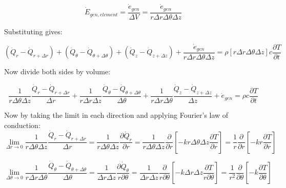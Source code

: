 \documentclass[conf]{new-aiaa}
\begin{document}
\begin{equation*}
    \dot{E}_{gen,element} = \frac{\dot{e}_{gen}}{\Delta V} = \frac{\dot{e}_{gen}}{r\Delta r \Delta \theta \Delta z}
\end{equation*}

\noindent Substituting gives:

\begin{equation*}
    \left(\dot{Q}_{r}-\dot{Q}_{r+\Delta r}\right)+\left(\dot{Q}_{\theta}-\dot{Q}_{\theta+\Delta \theta}\right)+\left(\dot{Q}_{z}-\dot{Q}_{z+\Delta z}\right) + 
    \frac{\dot{e}_{gen}}{r\Delta r \Delta \theta \Delta z} 
    = \rho \left[r\Delta r \Delta \theta \Delta z\right] c \frac{\partial T}{\partial t}
\end{equation*}

\noindent Now divide both sides by volume:

\begin{equation*}
    \frac{1}{r \Delta \theta \Delta z}  \frac{\dot{Q}_{r}-\dot{Q}_{r+\Delta r}}{\Delta r}
    +\frac{1}{r \Delta r \Delta z} \frac{\dot{Q}_{\theta}-\dot{Q}_{\theta+\Delta \theta}}{\Delta \theta}
    +\frac{1}{r \Delta r \Delta \theta} \frac{\dot{Q}_{z}-\dot{Q}_{z+\Delta z}}{\Delta z} 
    + \dot{e}_{gen} 
    = \rho c \frac{\partial T}{\partial t}
\end{equation*}

\noindent Now by taking the limit in each direction and applying Fourier's law of conduction:
\begin{equation*}
    \lim_{\Delta r \rightarrow 0}
    \frac{1}{r \Delta \theta \Delta z}  \frac{\dot{Q}_{r}-\dot{Q}_{r+\Delta r}}{\Delta r}
    = \frac{1}{r \Delta \theta \Delta z} \frac{\partial \dot{Q}_r}{\partial r}
    = \frac{1}{r \Delta \theta \Delta z} \frac{\partial}{\partial r} \left[-k r \Delta \theta \Delta z \frac{\partial T}{\partial r}\right]
    = \frac{1}{r} \frac{\partial}{\partial r} \left[-k r \frac{\partial T}{\partial r}\right]
\end{equation*}


\begin{equation*}
    \lim_{\Delta \theta \rightarrow 0}
    \frac{1}{r \Delta r \Delta \theta} \frac{\dot{Q}_{\theta}-\dot{Q}_{\theta+\Delta \theta}}{\Delta \theta}
    = \frac{1}{\Delta r \Delta z} \frac{\partial \dot{Q}_{\theta}}{r \partial \theta}
    = \frac{1}{\Delta r \Delta z} \frac{\partial}{r \partial \theta}\left[-k\Delta r \Delta z \frac{\partial T}{ r \partial \theta}\right]
    = \frac{1}{r^2} \frac{\partial}{\partial \theta}\left[-k \frac{\partial T}{ \partial \theta}\right]
\end{equation*}
\end{document}
